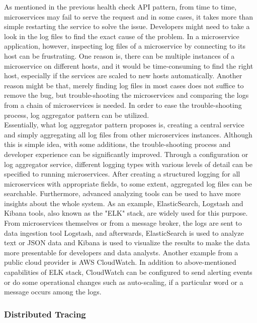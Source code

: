 \documentclass{Configuration_Files/PoliMi3i_thesis}
\begin{document}
As mentioned in the previous health check API pattern, from time to time, microservices may fail to serve the request and in some cases, it takes more than simple restarting the service to solve the issue.
Developers might need to take a look in the log files to find the exact cause of the problem.
In a microservice application, however, inspecting log files of a microservice by connecting to its host can be frustrating.
One reason is, there can be multiple instances of a microservice on different hosts, and it would be time-consuming to find the right host, especially if the services are scaled to new hosts automatically.
Another reason might be that, merely finding log files in most cases does not suffice to remove the bug, but trouble-shooting the microservices and comparing the logs from a chain of microservices is needed.
In order to ease the trouble-shooting process, log aggregator pattern can be utilized.
\\
Essentially, what log aggregator pattern proposes is, creating a central service and simply aggregating all log files from other microservices instances. Although this is simple idea, with some additions, the trouble-shooting process and developer experience can be significantly improved.
Through a configuration or log aggregator service, different logging types with various levels of detail can be specified to running microservices.
After creating a structured logging for all microservices with appropriate fields, to some extent, aggregated log files can be searchable.
Furthermore, advanced analyzing tools can be used to have more insights about the whole system.
As an example, ElasticSearch, Logstash and Kibana tools, also known as the "ELK" stack, are widely used for this purpose.
From microservices themselves or from a message broker, the logs are sent to data ingestion tool Logstash, and afterwards, ElasticSearch is used to analyze text or JSON data and Kibana is used to visualize the results to make the data more presentable for developers and data analysts.
Another example from a public cloud provider is AWS CloudWatch.
In addition to above-mentioned capabilities of ELK stack, CloudWatch can be configured to send alerting events or do some operational changes such as auto-scaling, if a particular word or a message occurs among the logs.

\subsubsection{Distributed Tracing}
\label{subsubsec:distributed_tracing}
\end{document}
